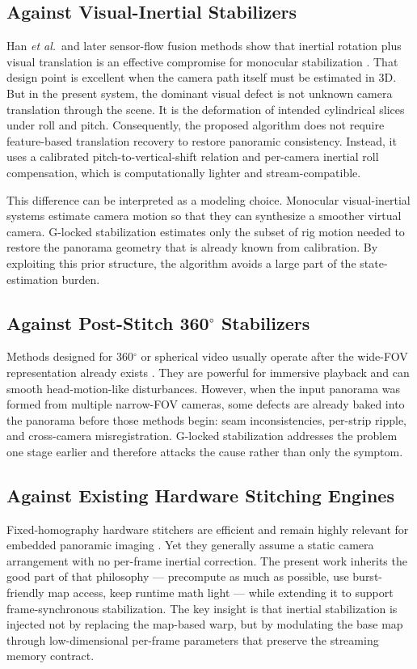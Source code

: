 \documentclass[journal]{IEEEtran}
\newcommand{\etal}{\textit{et al.}}
\begin{document}
\subsection{Against Visual-Inertial Stabilizers}
Han \etal\ and later sensor-flow fusion methods show that inertial rotation plus visual translation is an effective compromise for monocular stabilization \cite{han2021tmc,shi2022deepfvs,yu2025sensorflow}. That design point is excellent when the camera path itself must be estimated in 3D. But in the present system, the dominant visual defect is not unknown camera translation through the scene. It is the deformation of intended cylindrical slices under roll and pitch. Consequently, the proposed algorithm does not require feature-based translation recovery to restore panoramic consistency. Instead, it uses a calibrated pitch-to-vertical-shift relation and per-camera inertial roll compensation, which is computationally lighter and stream-compatible.

This difference can be interpreted as a modeling choice. Monocular visual-inertial systems estimate camera motion so that they can synthesize a smoother virtual camera. G-locked stabilization estimates only the subset of rig motion needed to restore the panorama geometry that is already known from calibration. By exploiting this prior structure, the algorithm avoids a large part of the state-estimation burden.

\subsection{Against Post-Stitch 360$^\circ$ Stabilizers}
Methods designed for 360$^\circ$ or spherical video usually operate after the wide-FOV representation already exists \cite{kopf2016omnistab,arora2018stab360,tang2018joint360}. They are powerful for immersive playback and can smooth head-motion-like disturbances. However, when the input panorama was formed from multiple narrow-FOV cameras, some defects are already baked into the panorama before those methods begin: seam inconsistencies, per-strip ripple, and cross-camera misregistration. G-locked stabilization addresses the problem one stage earlier and therefore attacks the cause rather than only the symptom.

\subsection{Against Existing Hardware Stitching Engines}
Fixed-homography hardware stitchers are efficient and remain highly relevant for embedded panoramic imaging \cite{suk2015hwstitch,jia2024fpga}. Yet they generally assume a static camera arrangement with no per-frame inertial correction. The present work inherits the good part of that philosophy --- precompute as much as possible, use burst-friendly map access, keep runtime math light --- while extending it to support frame-synchronous stabilization. The key insight is that inertial stabilization is injected not by replacing the map-based warp, but by modulating the base map through low-dimensional per-frame parameters that preserve the streaming memory contract.
\end{document}
